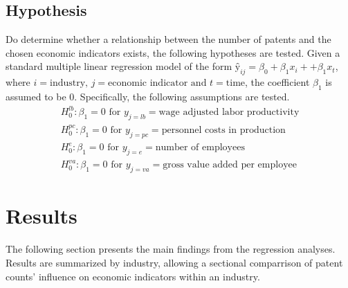 \documentclass[
  11,
  a4paperpaper,
]{article}
\let\oldsection\section
\renewcommand\section{\clearpage\oldsection}
\begin{document}
\subsection{Hypothesis}\label{hypothesis}

Do determine whether a relationship between the number of patents and
the chosen economic indicators exists, the following hypotheses are
tested. Given a standard multiple linear regression model of the form
\(ŷ_{ij} = \beta_0 + \beta_1x_i + + \beta_1x_t\), where
\(i=\text{industry, }j=\text{economic indicator }\text{and }t=\text{time}\),
the coefficient \(\beta_1\) is assumed to be \(0\). Specifically, the
following assumptions are tested. \begin{align}
H_0^{lb}: \beta_1 = 0\text{ for }y_{j=lb}=\text{wage adjusted labor productivity} \\
H_0^{pc}: \beta_1 = 0\text{ for }y_{j=pc}=\text{personnel costs in production} \\
H_0^{e}: \beta_1 = 0\text{ for }y_{j=e}=\text{number of employees} \\
H_0^{va}: \beta_1 = 0\text{ for }y_{j=va}=\text{gross value added per employee}
\end{align}

\section{Results}\label{results}

The following section presents the main findings from the regression
analyses. Results are summarized by industry, allowing a sectional
comparrison of patent counts' influence on economic indicators within an
industry.

\end{document}
